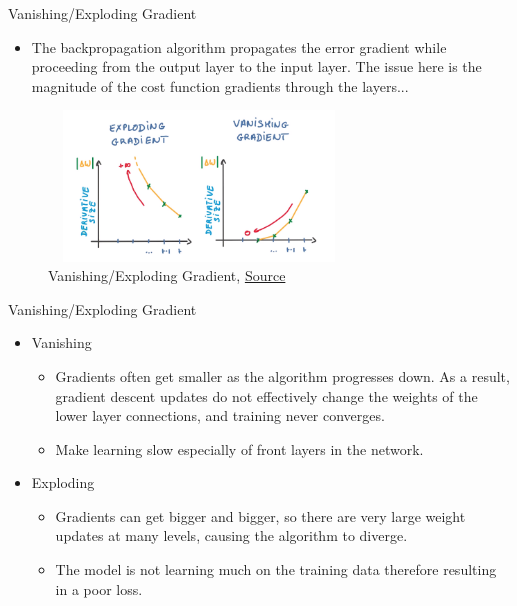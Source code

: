 \begin{frame}{Vanishing/Exploding Gradient}
	\begin{itemize}
		\item The backpropagation algorithm propagates the error gradient while proceeding from the output layer to the input layer. The issue here is the magnitude of the cost function gradients through the layers... 
	\end{itemize}
	\begin{figure}
		\centering
		\includegraphics[width=8cm, height=4cm]{Figs/van_2.png}
		\caption{Vanishing/Exploding Gradient, \href{https://medium.com/@ayushch612/vanishing-gradient-and-exploding-gradient-problems-7737c0aa535f}{Source}}
	\end{figure}
\end{frame}

\begin{frame}{Vanishing/Exploding Gradient}
	\begin{itemize}
		\item Vanishing
		\begin{itemize}
			\item Gradients often get smaller as the algorithm progresses down. As a result, gradient descent updates do not effectively change the weights of the lower layer connections, and training never converges.
			\medskip
			\item Make learning slow especially of front layers in the network.
			\medskip
		\end{itemize}
		\item Exploding
		\begin{itemize}
			\item Gradients can get bigger and bigger, so there are very large weight updates at many levels, causing the algorithm to diverge.
			\medskip
			\item The model is not learning much on the training data therefore resulting in a poor loss.
			\medskip
		\end{itemize}
	\end{itemize}
\end{frame}